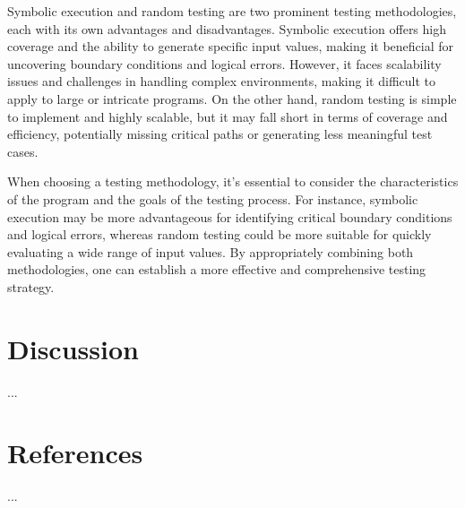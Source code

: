 \documentclass[11pt]{article}
\begin{document}
Symbolic execution and random testing are two prominent testing methodologies, each with its own advantages and disadvantages. Symbolic execution offers high coverage and the ability to generate specific input values, making it beneficial for uncovering boundary conditions and logical errors. However, it faces scalability issues and challenges in handling complex environments, making it difficult to apply to large or intricate programs. On the other hand, random testing is simple to implement and highly scalable, but it may fall short in terms of coverage and efficiency, potentially missing critical paths or generating less meaningful test cases.

When choosing a testing methodology, it's essential to consider the characteristics of the program and the goals of the testing process. For instance, symbolic execution may be more advantageous for identifying critical boundary conditions and logical errors, whereas random testing could be more suitable for quickly evaluating a wide range of input values. By appropriately combining both methodologies, one can establish a more effective and comprehensive testing strategy.


\section{Discussion}
...\\

\section{References}
...\\
\end{document}
